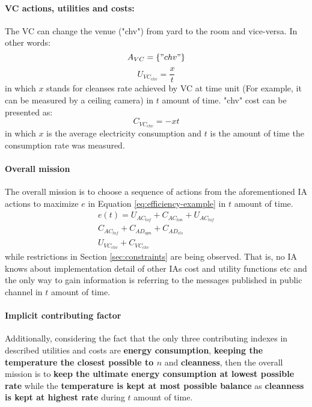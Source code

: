 \documentclass{article}
\begin{document}
\begin{multicols}{2}
				\paragraph{VC actions, utilities and costs:}	
					The VC can change the venue ("chv") from yard to the room and vice-versa. In other words:
					\begin{equation}
						A_{VC}=\{"chv"\}
						\label{eq:vc-actions}
					\end{equation}
					\begin{equation}
						U_{{VC}_{chv}} = \frac{x}{t}
						\label{eq:vc-action-utility-chv}
					\end{equation}
					in which $x$ stands for cleanses rate achieved by VC at time unit  (For example, it can be measured by a ceiling camera) in $t$ amount of time. "chv" cost can be presented as: 
					\begin{equation}
						C_{{VC}_{chv}} = - xt
						\label{eq:vc-action-cost-chv}
					\end{equation}
					in which $x$ is the average electricity consumption and $t$ is the amount of time the consumption rate  was measured. 
					
					\paragraph{Overall mission}
						The overall mission is to choose a sequence of actions from the aforementioned IA actions to maximize $e$ in Equation \ref{eq:efficiency-example} in $t$ amount of time. 
						\begin{multline}
							e(t) = U_{{AC}_{tof}} + C_{{AC}_{ton}} + U_{{AC}_{tof}}
							\\
							C_{{AC}_{tof}} + C_{{AD}_{opn}} + C_{{AD}_{cls}}
							\\
							U_{{VC}_{chv}} + C_{{VC}_{chv}}
							\label{eq:efficiency-example}
						\end{multline}
						while restrictions in Section \ref{sec:constraints} are being observed. That is, no IA knows about implementation detail of other IAs cost and utility functions etc and the only way to gain information is referring to the messages published in public channel in $t$ amount of time.
						
						\paragraph{Implicit contributing factor} Additionally, considering the fact that the only three contributing indexes in described utilities and costs are \textbf{energy consumption}, \textbf{keeping the temperature the closest possible to $n$} and \textbf{cleanness}, then the overall mission is to \textbf{keep the ultimate energy consumption at lowest possible rate} while the \textbf{temperature is kept at most possible balance} as \textbf{ cleanness is kept at highest rate} during $t$ amount of time.  
	

\end{multicols}
\end{document}
